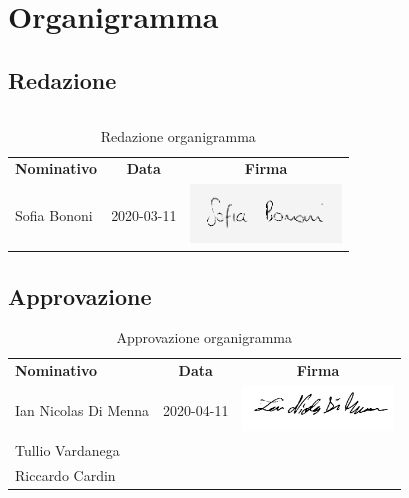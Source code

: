 \documentclass[../piano-di-progetto.tex]{subfiles}
\begin{document}
  \section{Organigramma}

  \subsection{Redazione}

  \begin{table}[H]
    \begin{tabular}{lcc}
         
    \end{tabular}
  \end{table}

  
  
  \begin{table}[H]
    \centering
    \begin{tabular}{lcc}
      \rowcolor{lightgray}

      \textbf{Nominativo}  & \textbf{Data} & \textbf{Firma}  \\
    Sofia Bononi & 2020-03-11 & \includegraphics[width=4cm]{img/sofia-g.png}     \\    
    \end{tabular}
    \caption{Redazione organigramma}
  \end{table}

  \subsection{Approvazione}

  \begin{table}[H]
    \centering
    \begin{tabular}{lcc}
      \rowcolor{lightgray}
      \textbf{Nominativo}  & \textbf{Data} & \textbf{Firma}  \\
      Ian Nicolas Di Menna & 2020-04-11 & \includegraphics[width=4cm]{img/ian.png}     \\
      Tullio Vardanega & &    \\
      Riccardo Cardin & &
    \end{tabular}
    \caption{Approvazione organigramma}
  \end{table}
\end{document}
